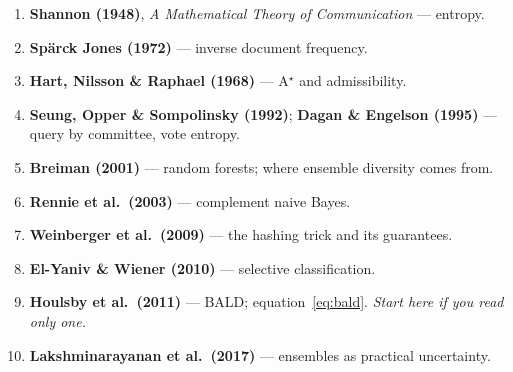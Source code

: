 \begin{enumerate}[leftmargin=*,itemsep=3pt]
  \item \textbf{Shannon (1948)}, \emph{A Mathematical Theory of Communication} --- entropy.
  \item \textbf{Sp\"arck Jones (1972)} --- inverse document frequency.
  \item \textbf{Hart, Nilsson \& Raphael (1968)} --- A$^\star$ and admissibility.
  \item \textbf{Seung, Opper \& Sompolinsky (1992)}; \textbf{Dagan \& Engelson (1995)} --- query by committee, vote entropy.
  \item \textbf{Breiman (2001)} --- random forests; where ensemble diversity comes from.
  \item \textbf{Rennie et al.\ (2003)} --- complement naive Bayes.
  \item \textbf{Weinberger et al.\ (2009)} --- the hashing trick and its guarantees.
  \item \textbf{El-Yaniv \& Wiener (2010)} --- selective classification.
  \item \textbf{Houlsby et al.\ (2011)} --- BALD; equation~\eqref{eq:bald}. \emph{Start here if you read only one.}
  \item \textbf{Lakshminarayanan et al.\ (2017)} --- ensembles as practical uncertainty.
\end{enumerate}
